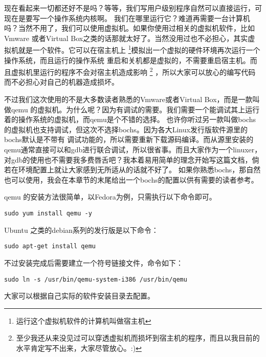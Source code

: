 \par 现在看起来一切都还好不是吗？等等，我们写用户级别程序自然可以直接运行，可现在是要写一个操作系统内核啊。\allowbreak
我们在哪里运行它？难道再需要一台计算机吗？当然不用了，我们可以使用虚拟机。如果你使用过相关的虚拟机软件，比如Vmware\allowbreak
或者Virtual Box之类的话那就太好了。当然没用过也不必担心，其实虚拟机就是一个软件。它可以在宿主机上\allowbreak
\footnote{运行这个虚拟机软件的计算机叫做宿主机}模拟出一个虚拟的硬件环境再次运行一个操作系统，而且运行的操作系统\allowbreak
重启和关机都是虚拟的，不需要重启宿主机。而且虚拟机里运行的程序不会对宿主机造成影响\allowbreak
\footnote{至少我还从来没见过可以穿透虚拟机而损坏到宿主机的程序，而且以我目前的水平肯定写不出来，大家尽管放心。:) }
，所以大家可以放心的编写代码而不必担心对自己的机器造成损坏。

\par 不过我们这次使用的不是大多数读者熟悉的Vmware或者Virtual Box，而是一款叫做qemu\allowbreak
的虚拟机。为什么呢？因为有调试的需要。我们需要一个能调试其上运行着的操作系统的虚拟机，而qemu是个不错的选择。\allowbreak
也许你听过另一款叫做bochs的虚拟机也支持调试，但这次不选择bochs。因为各大Linux发行版软件源里的bochs默认是不带有\allowbreak
调试功能的，所以需要重新下载源码编译。而从源里安装的qemu通常直接可以和gdb进行联合调试，所以很省事。而且大家作为一个linuxer，\allowbreak
对gdb的使用也不需要我多费唇舌吧？我本着易用简单的理念开始写这篇文档，倘若在环境配置上就让大家感到无所适从的话就不好了。\allowbreak
如果你熟悉bochs，那自然也可以使用，我会在本章节的末尾给出一个bochs的配置以供有需要的读者参考。

qemu 的安装方法很简单，以Fedora为例，只需执行以下命令即可。
\begin{Verbatim}[frame=single]
    sudo yum install qemu -y
\end{Verbatim}

\par Ubuntu 之类的debian系列的发行版是以下命令：
\begin{Verbatim}[frame=single]
    sudo apt-get install qemu
\end{Verbatim}

\par 不过安装完成后需要建立一个符号链接文件，命令如下：

\begin{Verbatim}[frame=single]
    sudo ln -s /usr/bin/qemu-system-i386 /usr/bin/qemu
\end{Verbatim}

\par 大家可以根据自己实际的软件安装目录去配置。

